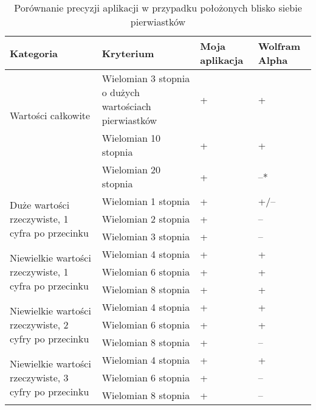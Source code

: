 \begin{table}
	\caption{Porównanie precyzji aplikacji w przypadku położonych blisko siebie pierwiastków}
	\begin{tabular}{ |p{5cm}|p{5cm}|p{1.5cm}|p{1.5cm}| } 
		\hline
		Kategoria & Kryterium & Moja aplikacja & Wolfram Alpha \\
		\hline
		\multirow{2}{*}{Wartości całkowite}
		& Wielomian 3 stopnia o dużych wartościach pierwiastków & + & + \\
		& Wielomian 10 stopnia & + & + \\
		& Wielomian 20 stopnia & + & --* \\
		\hline
		\multirow{3}{12em}{Duże wartości rzeczywiste, 1 cyfra po przecinku}
		& Wielomian 1 stopnia & + & +/-- \\
		& Wielomian 2 stopnia & + & -- \\
		& Wielomian 3 stopnia & + & -- \\
		\hline
		\multirow{3}{14em}{Niewielkie wartości rzeczywiste, 1 cyfra po przecinku}
		& Wielomian 4 stopnia & + & + \\
		& Wielomian 6 stopnia & + & + \\
		& Wielomian 8 stopnia & + & + \\
		\hline
		\multirow{3}{14em}{Niewielkie wartości rzeczywiste, 2 cyfry po przecinku}
		& Wielomian 4 stopnia & + & + \\
		& Wielomian 6 stopnia & + & + \\
		& Wielomian 8 stopnia & + & -- \\
		\hline
		\multirow{3}{14em}{Niewielkie wartości rzeczywiste, 3 cyfry po przecinku}
		& Wielomian 4 stopnia & + & + \\
		& Wielomian 6 stopnia & + & -- \\
		& Wielomian 8 stopnia & + & -- \\
		\hline
	\end{tabular}
\end{table}